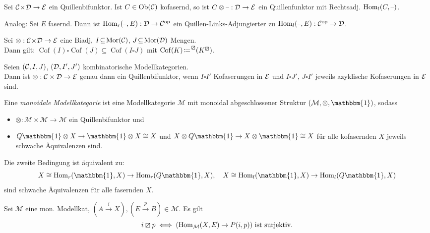 \documentclass{cheat-sheet}
\newcommand{\lhhe}{\boxslash} %
\newcommand{\ModC}{\mathcal{M}} %
\DeclareMathOperator{\Coff}{Cof} %
\newcommand{\UnitOb}{\mathbbm{1}} %
\begin{document}
\begin{prop}
  Sei $\mathcal{C} \!\times\! \mathcal{D} \to \mathcal{E}$ ein Quillenbifunktor.
  Ist $C \in \operatorname{Ob}(\mathcal{C})$ kofasernd, so ist $C \otimes \text{--} : \mathcal{D} \to \mathcal{E}$ ein Quillenfunktor mit Rechtsadj. $\operatorname{Hom}_l(C, \text{--})$.
\end{prop}

\begin{bem}
  Analog: Sei $E$ fasernd.
  Dann ist $\operatorname{Hom}_r(\text{--}, E) : \mathcal{D} \to \mathcal{C}^{\mathrm{op}}$ ein Quillen-Links-Adjungierter zu $\operatorname{Hom}_l(\text{--}, E) : \mathcal{C}^{\mathrm{op}} \to \mathcal{D}$.
\end{bem}

\begin{lem}
  Sei $\otimes : \mathcal{C} \!\times\! \mathcal{D} \to \mathcal{E}$ eine Biadj, $I \!\subseteq\! \operatorname{Mor}(\mathcal{C})$, $J \!\subseteq\! \operatorname{Mor}(\mathcal{D})$ Mengen. \\
  Dann gilt:
  $\Coff(I) \square \Coff(J) \subseteq \Coff(I \square J)$
  mit $\Coff(K) \!\coloneqq\! \prescript{\lhhe}{} (K^\lhhe)$.
\end{lem}

\begin{satz}
  Seien $(\mathcal{C}, I, J)$, $(\mathcal{D}, I', J')$ kombinatorische Modellkategorien. \\
  Dann ist $\otimes : \mathcal{C} \times \mathcal{D} \to \mathcal{E}$ genau dann ein Quillenbifunktor, wenn $I \square I'$ Kofaserungen in $\mathcal{E}$ und $I \square J'$, $J \square I'$ jeweils azyklische Kofaserungen in $\mathcal{E}$ sind.
\end{satz}

\begin{defn}
  Eine \emph{monoidale Modellkategorie} ist eine Modellkategorie $\ModC$ mit monoidal abgeschlossener Struktur $(\ModC, \otimes, \UnitOb)$, sodass
  \begin{itemize}
    \item $\otimes : \ModC \times \ModC \to \ModC$ ein Quillenbifunktor und
    \item $Q \UnitOb \otimes X \to \UnitOb \otimes X \cong X$ und $X \otimes Q \UnitOb \to X \otimes \UnitOb \cong X$ für alle kofasernden $X$ jeweils schwache Äquivalenzen sind.
  \end{itemize}
\end{defn}

\begin{bem}
  Die zweite Bedingung ist äquivalent zu:
  \[
    X \cong \Hom_r(\UnitOb, X) \to \Hom_r(Q \UnitOb, X), \quad
    X \cong \Hom_l(\UnitOb, X) \to \Hom_l(Q \UnitOb, X)
  \]
  sind schwache Äquivalenzen für alle fasernden $X$.
\end{bem}

\begin{beob}
  Sei $\ModC$ eine mon. Modellkat, $(A \xrightarrow{i} X), (E \xrightarrow{p} B) \in \ModC$.
  Es gilt
  \[ i \lhhe p \iff (\Hom_\ModC(X, E) \to P(i, p)) \text{ ist surjektiv.} \]
\end{beob}


\pagebreak

\end{document}
